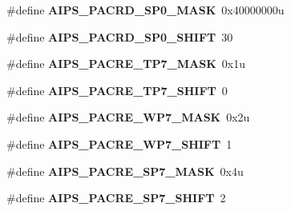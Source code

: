 \begin{DoxyCompactItemize}
\item 
\hypertarget{group___a_i_p_s___register___masks_ga4b4b9b7c34e414f70b7bec814e4d4188}{}\#define {\bfseries A\+I\+P\+S\+\_\+\+P\+A\+C\+R\+D\+\_\+\+S\+P0\+\_\+\+M\+A\+S\+K}~0x40000000u\label{group___a_i_p_s___register___masks_ga4b4b9b7c34e414f70b7bec814e4d4188}

\item 
\hypertarget{group___a_i_p_s___register___masks_ga9fdb80a8a443be4b480e4174d9f94866}{}\#define {\bfseries A\+I\+P\+S\+\_\+\+P\+A\+C\+R\+D\+\_\+\+S\+P0\+\_\+\+S\+H\+I\+F\+T}~30\label{group___a_i_p_s___register___masks_ga9fdb80a8a443be4b480e4174d9f94866}

\item 
\hypertarget{group___a_i_p_s___register___masks_ga09a9f605281c2e4b7ddb70e8b8bdb14d}{}\#define {\bfseries A\+I\+P\+S\+\_\+\+P\+A\+C\+R\+E\+\_\+\+T\+P7\+\_\+\+M\+A\+S\+K}~0x1u\label{group___a_i_p_s___register___masks_ga09a9f605281c2e4b7ddb70e8b8bdb14d}

\item 
\hypertarget{group___a_i_p_s___register___masks_gadef361b9d8de86e86f2222359399e2b4}{}\#define {\bfseries A\+I\+P\+S\+\_\+\+P\+A\+C\+R\+E\+\_\+\+T\+P7\+\_\+\+S\+H\+I\+F\+T}~0\label{group___a_i_p_s___register___masks_gadef361b9d8de86e86f2222359399e2b4}

\item 
\hypertarget{group___a_i_p_s___register___masks_ga4826af7b2acfd85ab3b91cde438d040f}{}\#define {\bfseries A\+I\+P\+S\+\_\+\+P\+A\+C\+R\+E\+\_\+\+W\+P7\+\_\+\+M\+A\+S\+K}~0x2u\label{group___a_i_p_s___register___masks_ga4826af7b2acfd85ab3b91cde438d040f}

\item 
\hypertarget{group___a_i_p_s___register___masks_ga102082b3478168eda766855edf21fcc8}{}\#define {\bfseries A\+I\+P\+S\+\_\+\+P\+A\+C\+R\+E\+\_\+\+W\+P7\+\_\+\+S\+H\+I\+F\+T}~1\label{group___a_i_p_s___register___masks_ga102082b3478168eda766855edf21fcc8}

\item 
\hypertarget{group___a_i_p_s___register___masks_ga2794dca193467df550c24215a2edbdd0}{}\#define {\bfseries A\+I\+P\+S\+\_\+\+P\+A\+C\+R\+E\+\_\+\+S\+P7\+\_\+\+M\+A\+S\+K}~0x4u\label{group___a_i_p_s___register___masks_ga2794dca193467df550c24215a2edbdd0}

\item 
\hypertarget{group___a_i_p_s___register___masks_gabca1ef6f083fc53e325833662065ee25}{}\#define {\bfseries A\+I\+P\+S\+\_\+\+P\+A\+C\+R\+E\+\_\+\+S\+P7\+\_\+\+S\+H\+I\+F\+T}~2\label{group___a_i_p_s___register___masks_gabca1ef6f083fc53e325833662065ee25}


\end{DoxyCompactItemize}
